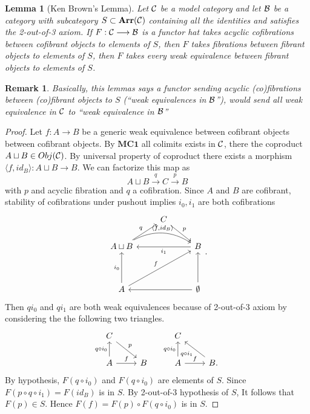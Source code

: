 \documentclass[11pt]{article}
\newtheorem{lemma}[thm]{Lemma}
\newtheorem{rmk}[thm]{Remark}
\newcommand{\calb}{{\cal B}}
\newcommand{\calc}{{\cal C}}
\newcommand{\lrta}{\longrightarrow}
\newcommand{\lgl}{\langle}
\newcommand{\rgl}{\rangle}
\begin{document}
\begin{lemma}[Ken Brown's Lemma]
Let $\calc$ be a model category and let $\calb$ be a category with subcategory $S\subset \mathbf{Arr}(\calc)$ containing all the identities and satisfies the 2-out-of-3 axiom. If $F:\calc\lrta \calb$ is a functor hat takes acyclic cofibrations between cofibrant objects to elements of $S$, then $F$ takes fibrations between fibrant objects to elements of $S$, then $F$ takes every weak equivalence between fibrant objects to elements of $S$.
\end{lemma}
\begin{rmk}
Basically, this lemmas says a functor sending acyclic (co)fibrations between (co)fibrant objects to $S$ (``weak equivalences in $\calb$''), would send all weak equivalence in $\calc$ to ``weak equivalence in $\calb$'' 
\end{rmk}
\begin{proof}
Let $f: A\lrta B$ be a generic weak equivalence between cofibrant objects between cofibrant objects. By $\mathbf{MC1}$ all colimits exists  in $\calc$, there the coproduct $A\sqcup B\in Obj(\calc)$. By universal property of coproduct there exists a morphism $\lgl f,id_B\rgl: A\sqcup B\lrta B$.
We can factorize this map as
$$
A\sqcup B\overset{q}{\lrta }C\overset{p}{\lrta }B 
$$
with $p$ and acyclic fibration and $q$ a cofibration. Since $A$ and $B$ are cofibrant, stability of cofibrations under pushout implies $i_0, i_1$ are both cofibrations  
$$
\begin{tikzcd}
 & C \arrow[rd, "p"] &  \\
A\sqcup B \arrow[rr, "{\lgl f,id_B\rgl}", bend left] \arrow[ru, "q"] &  & B \arrow[ll, "i_1"] \\
 &  &  \\
A \arrow[uu, "i_0"] \arrow[rruu, "f"] &  & \emptyset \arrow[ll] \arrow[uu]
\end{tikzcd}.
$$
Then $qi_0$ and $qi_1$ are both weak equivalences because of 2-out-of-3 axiom by considering the the following two triangles.
$$
\begin{tikzcd}
C \arrow[rd, "p"] &  & C &  \\
A \arrow[r, "f"] \arrow[u, "q\circ i_0"] & B & A \arrow[u, "q\circ i_0"] \arrow[r, "f"] & B \arrow[lu, "q\circ i_1"].
\end{tikzcd}
$$
By hypothesis, $F(q\circ i_0)$ and $F(q\circ i_0)$ are elements of $S$. Since $F(p\circ q\circ i_1)=F(id_B)$ is in $S$. By 2-out-of-3 hypothesis of $S$, It follows that $F(p)\in S$. Hence $F(f)=F(p)\circ F(q\circ i_0)$ is in $S$.
\end{proof}
\end{document}
